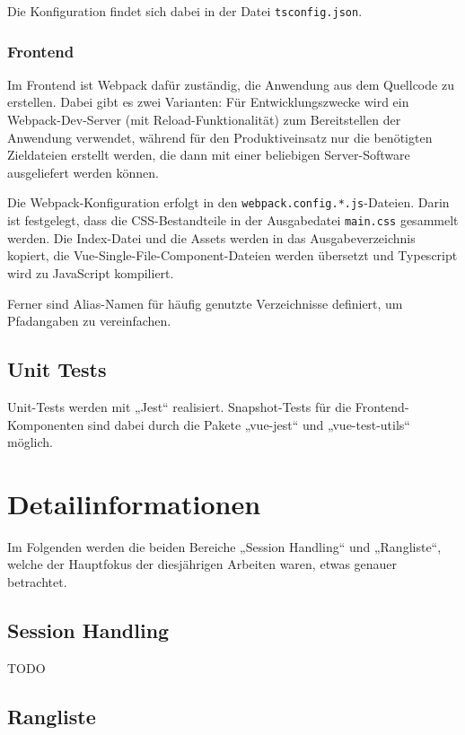 \documentclass[letterpaper, 10 pt, conference]{ieeeconf}
\begin{document}
Die Konfiguration findet sich dabei in der Datei \texttt{tsconfig.json}.

\subsubsection{Frontend}

Im Frontend ist Webpack dafür zuständig, die Anwendung aus dem Quellcode zu erstellen.
Dabei gibt es zwei Varianten:
Für Entwicklungszwecke wird ein Webpack-Dev-Server (mit Reload-Funktionalität) zum Bereitstellen der Anwendung verwendet,
während für den Produktiveinsatz nur die benötigten Zieldateien erstellt werden, die dann mit einer beliebigen Server-Software ausgeliefert werden können.

Die Webpack-Konfiguration erfolgt in den \texttt{webpack.config.*.js}-Dateien.
Darin ist festgelegt, dass die CSS-Bestandteile in der Ausgabedatei \texttt{main.css} gesammelt werden.
Die Index-Datei und die Assets werden in das Ausgabeverzeichnis kopiert, die Vue-Single-File-Component-Dateien werden übersetzt
und Typescript wird zu JavaScript kompiliert.

Ferner sind Alias-Namen für häufig genutzte Verzeichnisse definiert, um Pfadangaben zu vereinfachen.

\subsection{Unit Tests}

Unit-Tests werden mit „Jest“ realisiert.
Snapshot-Tests für die Frontend-Komponenten sind dabei durch die Pakete „vue-jest“ und „vue-test-utils“ möglich.

\section{Detailinformationen}

Im Folgenden werden die beiden Bereiche „Session Handling“ und „Rangliste“, welche der Hauptfokus der diesjährigen Arbeiten waren, etwas genauer betrachtet.

\subsection{Session Handling}

TODO

\subsection{Rangliste}
\end{document}
